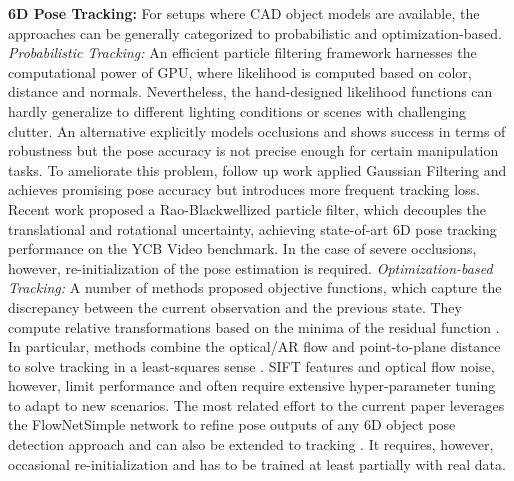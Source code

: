 \documentclass[letterpaper, 10 pt, conference]{ieeeconf}
\begin{document}
\noindent \textbf{6D Pose Tracking:} For setups where CAD object
models are available, the approaches can be generally categorized to probabilistic and optimization-based.
 \textit{Probabilistic Tracking:} An efficient particle filtering
framework \cite{choi2013rgb} harnesses the computational power of GPU,
where likelihood is computed based on color, distance and
normals. Nevertheless, the hand-designed likelihood functions can hardly generalize to different lighting conditions or scenes with challenging
clutter. An alternative \cite{Wthrich2013ProbabilisticOT} explicitly
models occlusions and shows success in terms of robustness but the
pose accuracy is not precise enough for certain manipulation tasks. To
ameliorate this problem, follow up work \cite{issac2016depth} applied
Gaussian Filtering and achieves promising pose accuracy but introduces
more frequent tracking loss. Recent work \cite{deng2019poserbpf}
proposed a Rao-Blackwellized particle filter, which decouples the
translational and rotational uncertainty, achieving state-of-art 6D
pose tracking performance on the YCB Video benchmark. In the case of
severe occlusions, however, re-initialization of the pose estimation
is required. \textit{Optimization-based Tracking:} A number of methods proposed objective functions, which capture the
discrepancy between the current observation and the previous state.
They compute relative transformations based on the minima of the
residual function \cite{schmidt2014dart, pauwels2015simtrack,
  joseph2015versatile, zhong2019robust, tjaden2018region}. In
particular, methods combine the optical/AR flow and point-to-plane distance to solve
tracking in a least-squares sense \cite{pauwels2015simtrack, schmidt2014dart}. SIFT features and optical flow noise, however, limit performance and often require extensive
hyper-parameter tuning to adapt to new scenarios. The most related effort to the current paper leverages the FlowNetSimple network
\cite{fischer2015flownet} to refine pose outputs of any 6D object pose
detection approach and can also be extended to tracking \cite{li2018deepim}. It requires,
however, occasional re-initialization and has to be trained at least
partially with real data.
\end{document}
